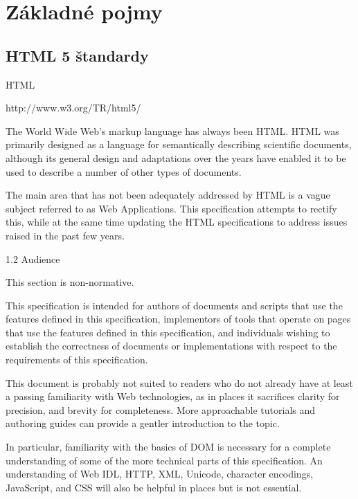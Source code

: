 \chapter{Základné pojmy}




\section{HTML 5 štandardy}

\ac*{HTML} 

http://www.w3.org/TR/html5/  

The World Wide Web's markup language has always been HTML. HTML was primarily designed as a language for semantically describing scientific documents, although its general design and adaptations over the years have enabled it to be used to describe a number of other types of documents.

The main area that has not been adequately addressed by HTML is a vague subject referred to as Web Applications. This specification attempts to rectify this, while at the same time updating the HTML specifications to address issues raised in the past few years.

1.2 Audience

This section is non-normative.

This specification is intended for authors of documents and scripts that use the features defined in this specification, implementors of tools that operate on pages that use the features defined in this specification, and individuals wishing to establish the correctness of documents or implementations with respect to the requirements of this specification.

This document is probably not suited to readers who do not already have at least a passing familiarity with Web technologies, as in places it sacrifices clarity for precision, and brevity for completeness. More approachable tutorials and authoring guides can provide a gentler introduction to the topic.

In particular, familiarity with the basics of DOM is necessary for a complete understanding of some of the more technical parts of this specification. An understanding of Web IDL, HTTP, XML, Unicode, character encodings, JavaScript, and CSS will also be helpful in places but is not essential.

